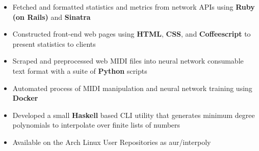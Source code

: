 \documentclass[10pt,a4paper]{altacv}
\begin{document}
\divider

\begin{itemize}
    \item Fetched and formatted statistics and metrics from network APIs 
        using \textbf{Ruby (on Rails)} and \textbf{Sinatra}
    \item Constructed front-end web pages using \textbf{HTML}, \textbf{CSS}, and 
        \textbf{Coffeescript} to present statistics to clients
\end{itemize}



\bigskip


\begin{itemize}
    \item Scraped and preprocessed web MIDI files into neural network 
        consumable text format with a suite of \textbf{Python} scripts
    \item Automated process of MIDI manipulation and neural network training 
        using \textbf{Docker}
\end{itemize}

\divider

\begin{itemize}
    \item Developed a small \textbf{Haskell} based CLI utility that generates 
        minimum degree polynomials to interpolate over finite lists of numbers
    \item Available on the Arch Linux User Repositories as aur/interpoly
\end{itemize}

\divider

\end{document}

